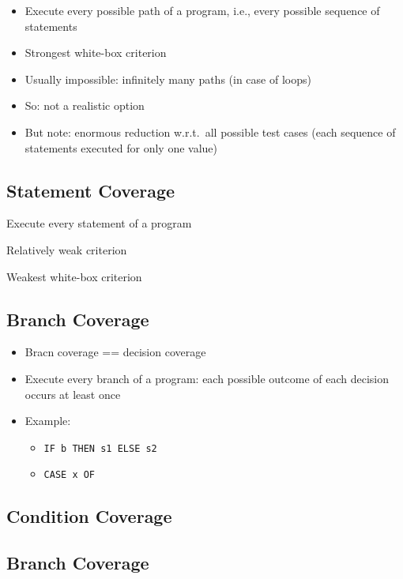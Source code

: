 \begin{itemize}
	\item Execute every possible path of a program, i.e., every possible sequence of statements
	\item Strongest white-box criterion
	\item Usually impossible: infinitely many paths (in case of loops)
	\item So: not a realistic option
	\item But note: enormous reduction w.r.t.\ all possible test cases (each sequence of statements executed for only one value)
\end{itemize}
		
\subsection{Statement Coverage}
			
\begin{itemize*}
	\item Execute every statement of a program
	\item Relatively weak criterion 
	\item Weakest white-box criterion
\end{itemize*}
				
\subsection{Branch Coverage}
			
\begin{itemize}
	\item Bracn coverage == decision coverage
	\item Execute every branch of a program: each possible outcome of each decision occurs at least once
	\item Example:
	\begin{itemize}
		\item \verb|IF b THEN s1 ELSE s2|
		\item \verb|CASE x OF|
	\end{itemize}
\end{itemize}
			
\subsection{Condition Coverage}
			
\subsection{Branch Coverage}
